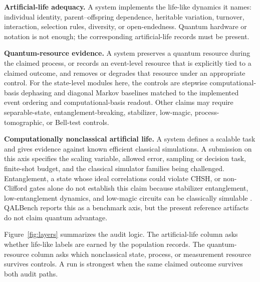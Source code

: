 \documentclass[11pt]{article}
\begin{document}
\textbf{Artificial-life adequacy.} A system implements the life-like dynamics it names: individual identity, parent--offspring dependence, heritable variation, turnover, interaction, selection rules, diversity, or open-endedness. Quantum hardware or notation is not enough; the corresponding artificial-life records must be present.

\textbf{Quantum-resource evidence.} A system preserves a quantum resource during the claimed process, or records an event-level resource that is explicitly tied to a claimed outcome, and removes or degrades that resource under an appropriate control. For the state-level modules here, the controls are stepwise computational-basis dephasing and diagonal Markov baselines matched to the implemented event ordering and computational-basis readout. Other claims may require separable-state, entanglement-breaking, stabilizer, low-magic, process-tomographic, or Bell-test controls.

\textbf{Computationally nonclassical artificial life.} A system defines a scalable task and gives evidence against known efficient classical simulations. A submission on this axis specifies the scaling variable, allowed error, sampling or decision task, finite-shot budget, and the classical simulator families being challenged. Entanglement, a state whose ideal correlations could violate CHSH, or non-Clifford gates alone do not establish this claim because stabilizer entanglement, low-entanglement dynamics, and low-magic circuits can be classically simulable \citep{gottesman1998heisenberg,aaronson2004improved,vidal2003efficient,bravyi2005universal,veitch2012negative,howard2014contextuality,pashayan2015estimating,bravyi2016improved,huang2020classical}. QALBench reports this as a benchmark axis, but the present reference artifacts do not claim quantum advantage.

Figure~\ref{fig:layers} summarizes the audit logic. The artificial-life column asks whether life-like labels are earned by the population records. The quantum-resource column asks which nonclassical state, process, or measurement resource survives controls. A run is strongest when the same claimed outcome survives both audit paths.
\end{document}
